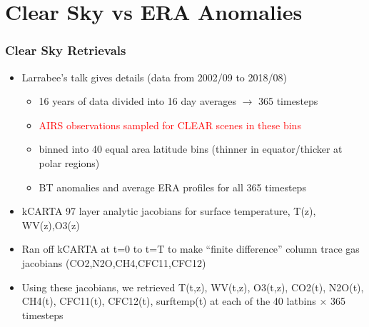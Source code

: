 \documentclass[10pt,t]{beamer}
\begin{document}
\section{Clear Sky vs ERA Anomalies}
\begin{frame}
  \frametitle{Clear Sky Retrievals}
  \begin{itemize}
    \item Larrabee's talk gives details (data from 2002/09 to 2018/08)
      \begin{itemize}
        \item 16 years of data divided into 16 day averages $\rightarrow$ 365 timesteps
        \item \textcolor{red}{AIRS observations sampled for CLEAR scenes in these bins}
        \item binned into 40 equal area latitude bins (thinner in equator/thicker at polar regions)
        \item BT anomalies and average ERA profiles for all 365 timesteps
      \end{itemize}
    \item kCARTA 97 layer analytic jacobians for surface temperature, T(z), WV(z),O3(z)
    \item Ran off kCARTA at t=0 to t=T to make ``finite difference'' column trace gas jacobians
          (CO2,N2O,CH4,CFC11,CFC12)
    \item Using these jacobians, we retrieved T(t,z), WV(t,z), O3(t,z), CO2(t), N2O(t), CH4(t), 
          CFC11(t), CFC12(t), surftemp(t)
          at each of the 40 latbins $\times $ 365 timesteps
  \end{itemize}
\end{frame}

\end{document}

